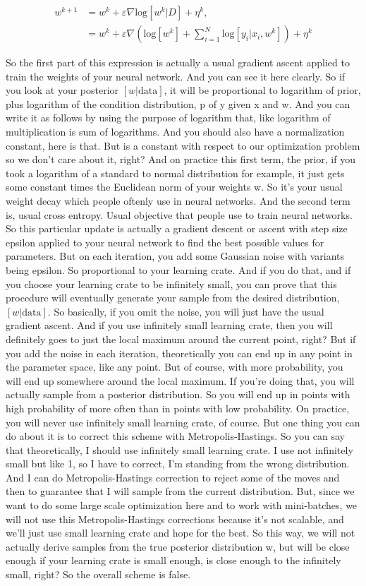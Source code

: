 \documentclass[11pt, oneside, reqno]{amsart}
\numberwithin{equation}{section}
\theoremstyle{plain}%
\theoremstyle{definition}
\theoremstyle{remark}
\begin{document}
\begin{align*}
	w^{k+1}&=w^k+\varepsilon\nabla \text{log}[w^k|D]+\eta^k,\\
	&=w^k+\varepsilon\nabla\left(\text{log}[w^k]+\sum^N_{i=1}\text{log}[y_i|x_i,w^k]\right)+\eta^k
\end{align*}

So the first part of this expression is actually a usual gradient ascent applied to train the weights of your neural network. And you can see it here clearly. So if you look at your posterior $[w|\text{data}]$, it will be proportional to logarithm of prior, plus logarithm of the condition distribution, p of y given x and w. And you can write it as follows by using the purpose of logarithm that, like logarithm of multiplication is sum of logarithms. And you should also have a normalization constant, here is that. But is a constant with respect to our optimization problem so we don't care about it, right? And on practice this first term, the prior, if you took a logarithm of a standard to normal distribution for example, it just gets some constant times the Euclidean norm of your weights w. So it's your usual weight decay which people oftenly use in neural networks. And the second term is, usual cross entropy. Usual objective that people use to train neural networks. So this particular update is actually a gradient descent or ascent with step size epsilon applied to your neural network to find the best possible values for parameters. But on each iteration, you add some Gaussian noise with variants being epsilon. So proportional to your learning crate. And if you do that, and if you choose your learning crate to be infinitely small, you can prove that this procedure will eventually generate your sample from the desired distribution, $[w|\text{data}]$. So basically, if you omit the noise, you will just have the usual gradient ascent. And if you use infinitely small learning crate, then you will definitely goes to just the local maximum around the current point, right? But if you add the noise in each iteration, theoretically you can end up in any point in the parameter space, like any point. But of course, with more probability, you will end up somewhere around the local maximum. If you're doing that, you will actually sample from a posterior distribution. So you will end up in points with high probability of more often than in points with low probability. On practice, you will never use infinitely small learning crate, of course. But one thing you can do about it is to correct this scheme with Metropolis-Hastings. So you can say that theoretically, I should use infinitely small learning crate. I use not infinitely small but like 1, so I have to correct, I'm standing from the wrong distribution. And I can do Metropolis-Hastings correction to reject some of the moves and then to guarantee that I will sample from the current distribution. But, since we want to do some large scale optimization here and to work with mini-batches, we will not use this Metropolis-Hastings corrections because it's not scalable, and we'll just use small learning crate and hope for the best. So this way, we will not actually derive samples from the true posterior distribution w, but will be close enough if your learning crate is small enough, is close enough to the infinitely small, right? So the overall scheme is false.
\end{document}
